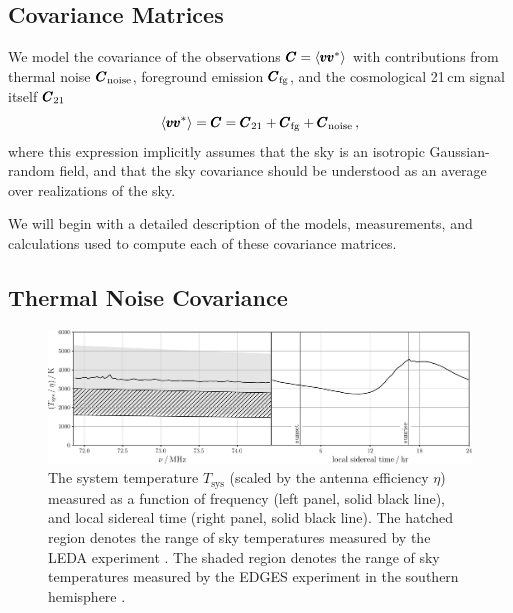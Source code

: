 \begin{bibunit}
\section{Covariance Matrices}\label{sec:sensitivity}

We model the covariance of the observations $\pmb C = \langle \pmb v \pmb v^*\rangle$ with contributions
from thermal noise $\pmb C_\text{noise}$, foreground emission $\pmb C_\text{fg}$, and the cosmological
21\,cm signal itself $\pmb C_\text{21}$
\begin{equation}\label{eq:sum-of-covariances}
    \langle\pmb v\pmb v^*\rangle = \pmb C
        = \pmb C_\text{21}
        + \pmb C_\text{fg}
        + \pmb C_\text{noise}\,,
\end{equation}
where this expression implicitly assumes that the sky is an isotropic Gaussian-random field, and
that the sky covariance should be understood as an average over realizations of the sky.

We will begin with a detailed description of the models, measurements, and calculations used to
compute each of these covariance matrices.

\subsection{Thermal Noise Covariance}\label{sec:noise-covariance}

\begin{figure}
    \centering
    \includegraphics[width=\textwidth]{figures/chapter4/system-temperature}
    \caption{
        The system temperature $T_\text{sys}$ (scaled by the antenna efficiency $\eta$) measured as
        a function of frequency (left panel, solid black line), and local sidereal time (right
        panel, solid black line). The hatched region denotes the range of sky temperatures measured
        by the LEDA experiment \citep{2018MNRAS.478.4193P}. The shaded region denotes the range of
        sky temperatures measured by the EDGES experiment in the southern hemisphere
        \citep{2017MNRAS.464.4995M}.
    }
    \label{fig:Tsys}
\end{figure}


\end{bibunit}
